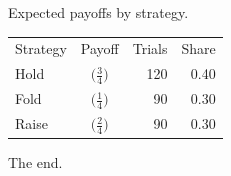 \documentclass{article}
\begin{document}
Expected payoffs by strategy.

\begin{tabular}{lcrr}
Strategy & Payoff & Trials & Share \\
Hold & $\Big(\frac{3}{4}\Big)$ & 120 & 0.40 \\
Fold & $\Big(\frac{1}{4}\Big)$ & 90 & 0.30 \\
Raise & $\Big(\frac{2}{4}\Big)$ & 90 & 0.30 \\
\end{tabular}

The end.
\end{document}
